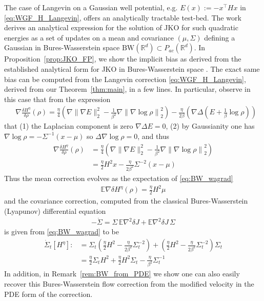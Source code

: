 \documentclass[reqno,11pt,letterpaper]{amsart}
\theoremstyle{plain}
\theoremstyle{definition}
\theoremstyle{remark}
\begin{document}
The case of Langevin on a Gaussian well potential, e.g. $E(x):= -x^{\top} H x$ in \eqref{eq:WGF_H_Langevin}, offers an analytically tractable test-bed. The work \cite{Halder2017} derives an analytical expression for the solution of JKO for such quadratic energies as a set of updates on a mean and covariance $(\mu, \Sigma)$ defining a Gaussian in Bures-Wasserstein space $\mathrm{BW}(\mathbb{R}^{d}) \subset P_{ac}(\mathbb{R}^{d})$. In Proposition~\ref{prop:JKO_FP}, we show the implicit bias as derived from the established analytical form for JKO in Bures-Wasserstein space \cite{Halder2017}. The exact same bias can be computed from the Langevin correction \eqref{eq:WGF_H_Langevin}, derived from our Theorem~\ref{thm:main}, in a few lines. In particular, observe in this case that from the expression
\begin{align}
    &\nabla \frac{\delta  H^{\eta}}{\delta \rho}(\rho) = \frac{\eta}{4} \left( \nabla \lVert \nabla E \rVert_{2}^{2} -   \frac{1}{\beta^{2}} \nabla \left\lVert \nabla \log \rho \right\rVert_{2}^{2} \right)
     -\frac{\eta}{2\beta} \left( 
    \nabla \Delta ( E + \frac{1}{\beta} \log \rho)
    \right)
\end{align}
that (1) the Laplacian component is zero $\nabla\Delta E = 0$, (2) by Gaussianity \cite{Halder2017} one has $\nabla \log \rho = -\Sigma^{-1}(x - \mu)$ so $\Delta \nabla \log \rho =0$, and thus
\begin{align}\label{eq:BW_wagrad}
    \nabla \frac{\delta  H^{\eta}}{\delta \rho}(\rho) &= \frac{\eta}{4} \left( \nabla \lVert \nabla E \rVert_{2}^{2} -   \frac{1}{\beta^{2}} \nabla \left\lVert \nabla \log \rho \right\rVert_{2}^{2} \right) \\
    &=  \frac{\eta}{2} H^{2} x - \frac{\eta}{2\beta^2} \Sigma^{-2}(x-\mu)
\end{align}
Thus the mean correction evolves as the expectation of \eqref{eq:BW_wagrad}
\begin{align}
   \mathbb{E}\nabla \delta  H^{\eta}(\rho) =\frac{\eta}{2} H^{2} \mu
\end{align}
and the covariance correction, computed from the classical Bures-Wasserstein (Lyapunov) differential equation \cite{chewi2024statistical}
\begin{align}
   -\dot{\Sigma} = \Sigma \, \mathbb{E}\nabla^{2}\delta J +\mathbb{E}\nabla^{2} \delta J\, \Sigma
\end{align}
is given from \eqref{eq:BW_wagrad} to be
\begin{align}
    \dot{\Sigma}_{t}[{H^{\eta}}] :&= \Sigma_{t} \left(\frac{\eta}{2} H^{2}- \frac{\eta}{2\beta^2} \Sigma_{t}^{-2} \right) + \left(\frac{\eta}{2} H^{2}- \frac{\eta}{2\beta^2} \Sigma_{t}^{-2} \right) \Sigma_{t} \\
    &= \frac{\eta}{2} \Sigma_{t} H^{2}  + \frac{\eta}{2} H^{2}\Sigma_{t} - \frac{\eta}{\beta^2} \Sigma_{t}^{-1} 
\end{align}
In addition, in Remark~\ref{rem:BW_from_PDE} we show one can also easily recover this Bures-Wasserstein flow correction from the modified velocity in the PDE form of the correction.
\end{document}
